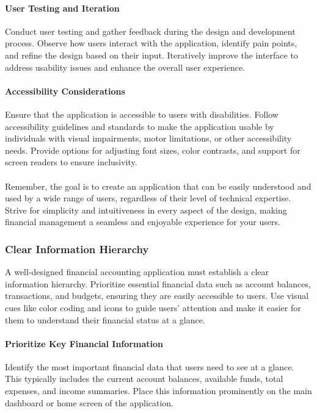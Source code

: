 \paragraph{User Testing and Iteration}
Conduct user testing and gather feedback during the design and development process. 
Observe how users interact with the application, identify pain points, and refine the design based on their input. 
Iteratively improve the interface to address usability issues and enhance the overall user experience.

\paragraph{Accessibility Considerations}
Ensure that the application is accessible to users with disabilities. Follow 
accessibility guidelines and standards to make the application usable by individuals with visual impairments, 
motor limitations, or other accessibility needs. Provide options for adjusting font sizes, color contrasts, and 
support for screen readers to ensure inclusivity.
\\
\\
Remember, the goal is to create an application that can be easily understood and used by a wide range of users, 
regardless of their level of technical expertise. Strive for simplicity and intuitiveness in every aspect of the 
design, making financial management a seamless and enjoyable experience for your users.


\subsubsection{Clear Information Hierarchy}
A well-designed financial accounting application must establish a clear information hierarchy. Prioritize essential 
financial data such as account balances, transactions, and budgets, ensuring they are easily accessible to users. 
Use visual cues like color coding and icons to guide users' attention and make it easier for them to understand 
their financial status at a glance.

\paragraph{Prioritize Key Financial Information}
Identify the most important financial data that users need to see at a glance. 
This typically includes the current account balances, available funds, total expenses, and income summaries. Place 
this information prominently on the main dashboard or home screen of the application.


